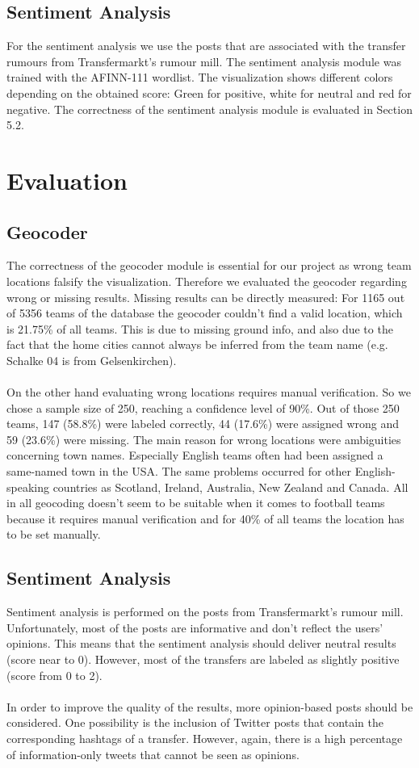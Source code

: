 \documentclass{article}
\begin{document}
\subsection{Sentiment Analysis}
For the sentiment analysis we use the posts that are associated with the transfer rumours from Transfermarkt's rumour mill. The sentiment analysis module was trained with the AFINN-111 wordlist. The visualization shows different colors depending on the obtained score: Green for positive, white for neutral and red for negative. The correctness of the sentiment analysis module is evaluated in Section 5.2.

\section{Evaluation}
\subsection{Geocoder}
The correctness of the geocoder module is essential for our project as wrong team locations falsify the visualization. Therefore we evaluated the geocoder regarding wrong or missing results. Missing results can be directly measured: For 1165 out of 5356 teams of the database the geocoder couldn't find a valid location, which is 21.75\% of all teams. This is due to missing ground info, and also due to the fact that the home cities cannot always be inferred from the team name (e.g. Schalke 04 is from Gelsenkirchen). 
\\ \\
On the other hand evaluating wrong locations requires manual verification. So we chose a sample size of 250, reaching a confidence level of 90\%. Out of those 250 teams, 147 (58.8\%) were labeled correctly, 44 (17.6\%) were assigned wrong and 59 (23.6\%) were missing. The main reason for wrong locations were ambiguities concerning town names. Especially English teams often had been assigned a same-named town in the USA. The same problems occurred for other English-speaking countries as Scotland, Ireland, Australia, New Zealand and Canada. All in all geocoding doesn't seem to be suitable when it comes to football teams because it requires manual verification and for 40\% of all teams the location has to be set manually.


\subsection{Sentiment Analysis}
Sentiment analysis is performed on the posts from Transfermarkt's rumour mill. Unfortunately, most of the posts are informative and don't reflect the users' opinions. This means that the sentiment analysis should deliver neutral results (score near to 0). However, most of the transfers are labeled as slightly positive (score from 0 to 2). 
\\ \\
In order to improve the quality of the results, more opinion-based posts should be considered. One possibility is the inclusion of Twitter posts that contain the corresponding hashtags of a transfer. However, again, there is a high percentage of information-only tweets that cannot be seen as opinions.
\end{document}
